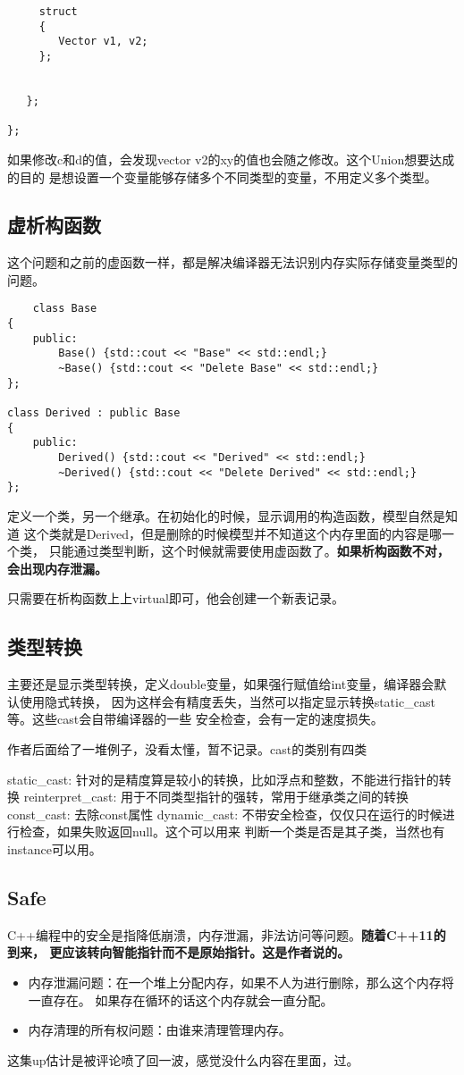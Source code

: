 \documentclass{article}
\begin{document}
\begin{sloppypar}
\begin{lstlisting}
     struct 
     {
        Vector v1, v2;
     };
     
     
   };
   
};
\end{lstlisting}
如果修改c和d的值，会发现vector v2的xy的值也会随之修改。这个Union想要达成的目的
是想设置一个变量能够存储多个不同类型的变量，不用定义多个类型。

\subsection{虚析构函数}
这个问题和之前的虚函数一样，都是解决编译器无法识别内存实际存储变量类型的问题。
\begin{lstlisting}
	class Base
{
    public:
        Base() {std::cout << "Base" << std::endl;}
        ~Base() {std::cout << "Delete Base" << std::endl;}
};

class Derived : public Base
{
    public:
        Derived() {std::cout << "Derived" << std::endl;}
        ~Derived() {std::cout << "Delete Derived" << std::endl;}
};
\end{lstlisting}
定义一个类，另一个继承。在初始化的时候，显示调用的构造函数，模型自然是知道
这个类就是Derived，但是删除的时候模型并不知道这个内存里面的内容是哪一个类，
只能通过类型判断，这个时候就需要使用虚函数了。\textbf{如果析构函数不对，
会出现内存泄漏。}

只需要在析构函数上上virtual即可，他会创建一个新表记录。
\subsection{类型转换}
主要还是显示类型转换，定义double变量，如果强行赋值给int变量，编译器会默认使用隐式转换，
因为这样会有精度丢失，当然可以指定显示转换static\_cast等。这些cast会自带编译器的一些
安全检查，会有一定的速度损失。

作者后面给了一堆例子，没看太懂，暂不记录。cast的类别有四类
\begin{outline}
	\1 static\_cast: 针对的是精度算是较小的转换，比如浮点和整数，不能进行指针的转换
	\1 reinterpret\_cast: 用于不同类型指针的强转，常用于继承类之间的转换
	\1 const\_cast: 去除const属性
	\1 dynamic\_cast: 不带安全检查，仅仅只在运行的时候进行检查，如果失败返回null。这个可以用来
	判断一个类是否是其子类，当然也有instance可以用。
\end{outline}

\subsection{Safe}
C++编程中的安全是指降低崩溃，内存泄漏，非法访问等问题。\textbf{随着C++11的到来，
更应该转向智能指针而不是原始指针。这是作者说的。}
\begin{itemize}
	\item 内存泄漏问题：在一个堆上分配内存，如果不人为进行删除，那么这个内存将一直存在。
	如果存在循环的话这个内存就会一直分配。
	\item 内存清理的所有权问题：由谁来清理管理内存。
\end{itemize}
这集up估计是被评论喷了回一波，感觉没什么内容在里面，过。


\end{sloppypar}
\end{document}
